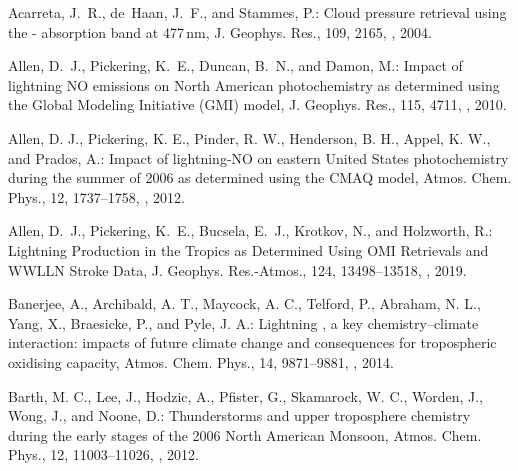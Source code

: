 \documentclass[amt]{copernicus}
\begin{document}
\begin{thebibliography}{105}


Acarreta, J.~R., de~Haan, J.~F., and Stammes, P.: Cloud pressure retrieval
  using the - absorption band at 477\,nm,
  J. Geophys. Res., 109, 2165, , 2004.

Allen, D.~J., Pickering, K.~E., Duncan, B.~N., and Damon, M.: Impact of
  lightning NO emissions on North American photochemistry as determined using
  the Global Modeling Initiative (GMI) model, J. Geophys. Res.,
  115, 4711, , 2010.

Allen, D. J., Pickering, K. E., Pinder, R. W., Henderson, B. H., Appel, K. W., and Prados, A.: Impact of lightning-NO on eastern United States photochemistry during the summer of 2006 as determined using the CMAQ model, Atmos. Chem. Phys., 12, 1737–1758, , 2012.

Allen, D.~J., Pickering, K.~E., Bucsela, E.~J., Krotkov, N., and Holzworth, R.:
  Lightning  Production in the Tropics as Determined Using
  OMI  Retrievals and WWLLN Stroke Data,
  J. Geophys. Res.-Atmos., 124, 13498--13518, , 2019.

Banerjee, A., Archibald, A. T., Maycock, A. C., Telford, P., Abraham, N. L., Yang, X., Braesicke, P., and Pyle, J. A.: Lightning , a key chemistry–climate interaction: impacts of future climate change and consequences for tropospheric oxidising capacity, Atmos. Chem. Phys., 14, 9871–9881, , 2014.

Barth, M. C., Lee, J., Hodzic, A., Pfister, G., Skamarock, W. C., Worden, J., Wong, J., and Noone, D.: Thunderstorms and upper troposphere chemistry during the early stages of the 2006 North American Monsoon, Atmos. Chem. Phys., 12, 11003–11026, , 2012.


\end{thebibliography}
\end{document}
